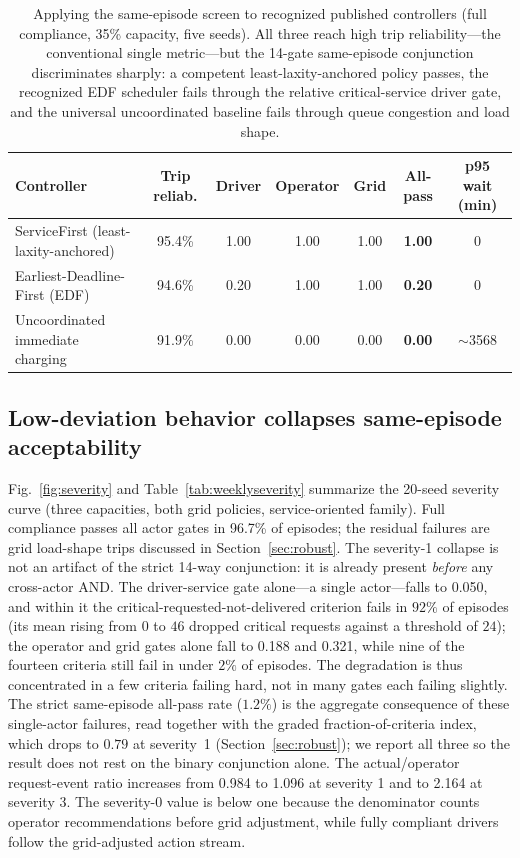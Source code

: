 \documentclass[12pt]{article}
\newcommand{\figref}[1]{Fig.~\ref{#1}}
\newcommand{\tabref}[1]{Table~\ref{#1}}
\begin{document}
\begin{table}[t]
\centering
\caption{Applying the same-episode screen to recognized published controllers (full compliance, 35\% capacity, five seeds). All three reach high trip reliability---the conventional single metric---but the 14-gate same-episode conjunction discriminates sharply: a competent least-laxity-anchored policy passes, the recognized EDF scheduler fails through the relative critical-service driver gate, and the universal uncoordinated baseline fails through queue congestion and load shape.}
\label{tab:published}
\begin{tabular}{lcccccc}
\hline
Controller & Trip reliab. & Driver & Operator & Grid & All-pass & p95 wait (min) \\
\hline
ServiceFirst (least-laxity-anchored) & 95.4\% & 1.00 & 1.00 & 1.00 & \textbf{1.00} & 0 \\
Earliest-Deadline-First (EDF) & 94.6\% & 0.20 & 1.00 & 1.00 & \textbf{0.20} & 0 \\
Uncoordinated immediate charging & 91.9\% & 0.00 & 0.00 & 0.00 & \textbf{0.00} & $\sim$3568 \\
\hline
\end{tabular}
\end{table}

\subsection{Low-deviation behavior collapses same-episode acceptability}

\figref{fig:severity} and \tabref{tab:weeklyseverity} summarize the 20-seed severity curve (three capacities, both grid policies, service-oriented family). Full compliance passes all actor gates in 96.7\% of episodes; the residual failures are grid load-shape trips discussed in Section~\ref{sec:robust}. The severity-1 collapse is not an artifact of the strict 14-way conjunction: it is already present \emph{before} any cross-actor AND. The driver-service gate alone---a single actor---falls to 0.050, and within it the critical-requested-not-delivered criterion fails in $92\%$ of episodes (its mean rising from $0$ to $46$ dropped critical requests against a threshold of $24$); the operator and grid gates alone fall to 0.188 and 0.321, while nine of the fourteen criteria still fail in under $2\%$ of episodes. The degradation is thus concentrated in a few criteria failing hard, not in many gates each failing slightly. The strict same-episode all-pass rate ($1.2\%$) is the aggregate consequence of these single-actor failures, read together with the graded fraction-of-criteria index, which drops to $0.79$ at severity~1 (Section~\ref{sec:robust}); we report all three so the result does not rest on the binary conjunction alone. The actual/operator request-event ratio increases from 0.984 to 1.096 at severity 1 and to 2.164 at severity 3. The severity-0 value is below one because the denominator counts operator recommendations before grid adjustment, while fully compliant drivers follow the grid-adjusted action stream.
\end{document}
